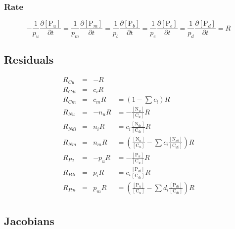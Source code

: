 \documentclass[12pt, a4paper]{article}
\begin{document}
\subsubsection{Rate}
\begin{equation}
-\frac{1}{p_u}\frac{\partial [\text{P}_u]}{\partial t} = \frac{1}{p_m}\frac{\partial [\text{P}_m]}{\partial t} = \frac{1}{p_b} \frac{\partial [\text{P}_b]}{\partial t} = \frac{1}{p_e} \frac{\partial [\text{P}_e]}{\partial t} = \frac{1}{p_d}\frac{\partial [\text{P}_d]}{\partial t} = R
\end{equation}

\subsection{Residuals}
\begin{align*}
R_{Cu} & =  &-R \\
R_{Cdi} & = & c_i R \\
R_{Cm} & =&  c_m R &= (1 - \sum c_i) R \\
R_{Nu} & = &-n_u R &=  -\frac{[\text{N}_u]}{[\text{C}_u]}R \\
R_{Ndi} & = & n_i R &= c_i\frac{[\text{N}_{di}]}{[\text{C}_{di}]} R \\
R_{Nm} & = & n_m R &= \left(\frac{[\text{N}_u]}{[\text{C}_u]} - \sum c_i\frac{[\text{N}_{di}]}{[\text{C}_{di}]}\right) R \\
R_{Pu} & = &-p_u R &= -\frac{[\text{P}_u]}{[\text{C}_u]}R \\
R_{Pdi} & = & p_i R &= c_i\frac{[\text{P}_{di}]}{[\text{C}_{di}]} R \\
R_{Pm} & = & p_m R &= \left(\frac{[\text{P}_u]}{[\text{C}_u]} - \sum d_i \frac{[\text{P}_{di}]}{[\text{C}_{di}]}\right) R \\
\end{align*}

\subsection{Jacobians}
\end{document}
